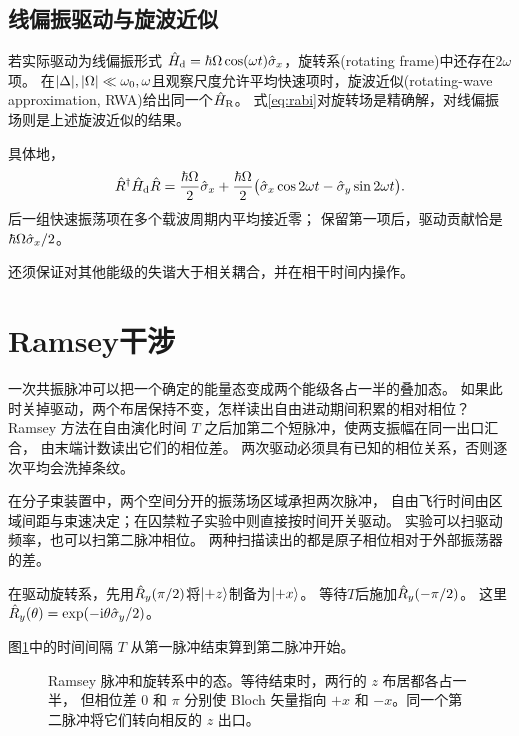 \subsection{线偏振驱动与旋波近似}

若实际驱动为线偏振形式
$\hat{H}_{\mathrm{d}} = \hbar\Omega\cos(\omega t)\hat{\sigma}_x$，旋转系(rotating frame)中还存在$2\omega$项。
在$\lvert\Delta\rvert,\lvert\Omega\rvert \ll \omega_0,\omega$且观察尺度允许平均快速项时，旋波近似(rotating-wave approximation, RWA)给出同一个$\hat{H}_{\mathrm{R}}$。
式\eqref{eq:rabi}对旋转场是精确解，对线偏振场则是上述旋波近似的结果。

具体地，
\begin{equation}
    \hat{R}^\dagger \hat{H}_{\mathrm{d}}\hat{R}
    = \frac{\hbar\Omega}{2}\hat{\sigma}_x
    + \frac{\hbar\Omega}{2}
    \bigl(\hat{\sigma}_x\cos2\omega t - \hat{\sigma}_y\sin2\omega t\bigr).
\end{equation}
后一组快速振荡项在多个载波周期内平均接近零；
保留第一项后，驱动贡献恰是$\hbar\Omega\hat{\sigma}_x/2$。

还须保证对其他能级的失谐大于相关耦合，并在相干时间内操作。

\section{Ramsey干涉}
\label{sec:ramsey}
一次共振脉冲可以把一个确定的能量态变成两个能级各占一半的叠加态。
如果此时关掉驱动，两个布居保持不变，怎样读出自由进动期间积累的相对相位？
Ramsey 方法在自由演化时间 $T$ 之后加第二个短脉冲，使两支振幅在同一出口汇合，
由末端计数读出它们的相位差。
两次驱动必须具有已知的相位关系，否则逐次平均会洗掉条纹\cite{ramsey}。

在分子束装置中，两个空间分开的振荡场区域承担两次脉冲，
自由飞行时间由区域间距与束速决定；在囚禁粒子实验中则直接按时间开关驱动。
实验可以扫驱动频率，也可以扫第二脉冲相位。
两种扫描读出的都是原子相位相对于外部振荡器的差。

在驱动旋转系，先用$\hat{R}_y(\pi/2)$将$\lvert+z\rangle$制备为$\lvert+x\rangle$。
等待$T$后施加$\hat{R}_y(-\pi/2)$。
这里$\hat{R}_y(\theta) = \exp(-\mathrm{i}\theta\hat{\sigma}_y/2)$。

图\ref{fig:ramsey-sequence}中的时间间隔 $T$ 从第一脉冲结束算到第二脉冲开始。
\begin{figure}[htbp]
    \centering{}
    \caption{Ramsey 脉冲和旋转系中的态。等待结束时，两行的 $z$ 布居都各占一半，
        但相位差 $0$ 和 $\pi$ 分别使 Bloch 矢量指向 $+x$ 和 $-x$。同一个第二脉冲将它们转向相反的 $z$ 出口。}
    \label{fig:ramsey-sequence}
\end{figure}

